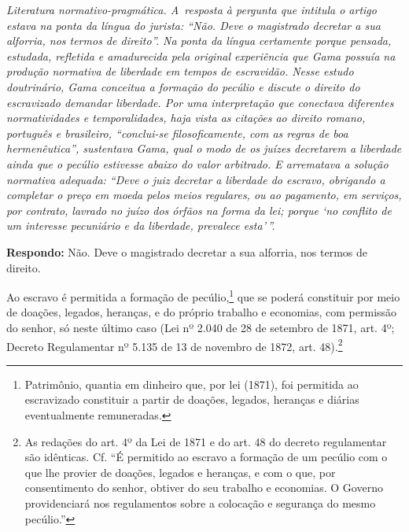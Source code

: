 \begin{resumo}
\emph{Literatura normativo-pragmática. A~resposta à pergunta que
intitula o artigo estava na ponta da língua do jurista: ``Não. Deve o
magistrado decretar a sua alforria, nos termos de direito''. Na ponta
da língua certamente porque pensada, estudada, refletida e amadurecida pela
original experiência que Gama possuía na produção normativa de liberdade
em tempos de escravidão. Nesse estudo doutrinário, Gama conceitua a
formação do pecúlio e discute o direito do escravizado demandar
liberdade. Por uma interpretação que conectava diferentes normatividades
e temporalidades, haja vista as citações ao direito romano, português e
brasileiro, ``conclui-se filosoficamente, com as regras de boa
hermenêutica'', sustentava Gama, qual o modo de os juízes decretarem a
liberdade ainda que o pecúlio estivesse abaixo do valor arbitrado. E
arrematava a solução normativa adequada: ``Deve o juiz decretar a
liberdade do escravo, obrigando a completar o preço em moeda pelos meios
regulares, ou ao pagamento, em serviços, por contrato, lavrado no juízo
dos órfãos na forma da lei; porque `no conflito de um interesse
pecuniário e da liberdade, prevalece esta'\,''. }
\end{resumo}

\pagebreak

\textbf{Respondo:} Não. Deve o magistrado decretar a sua alforria, nos termos de direito.

\asterisc

Ao escravo é permitida a formação de pecúlio,\footnote{Patrimônio,
  quantia em dinheiro que, por lei (1871), foi permitida ao escravizado
  constituir a partir de doações, legados, heranças e diárias
  eventualmente remuneradas.} que se poderá constituir por meio de
doações, legados, heranças, e do próprio trabalho e economias, com
permissão do senhor, só neste último caso (Lei nº 2.040 de 28 de
setembro de 1871, art. 4º; Decreto Regulamentar nº 5.135 de
13 de novembro de 1872, art. 48).\footnote{As redações do art. 4º da
  Lei de 1871 e do art. 48 do decreto regulamentar são idênticas. Cf. ``É
  permitido ao escravo a formação de um pecúlio com o que lhe provier de
  doações, legados e heranças, e com o que, por consentimento do senhor,
  obtiver do seu trabalho e economias. O Governo providenciará nos
  regulamentos sobre a colocação e segurança do mesmo pecúlio.''}

